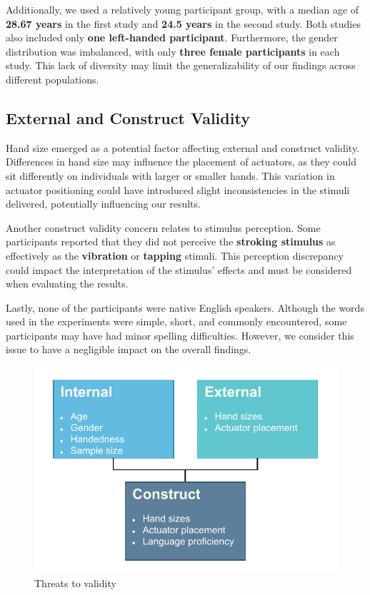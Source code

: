 Additionally, we used a relatively young participant group, with a median age of \textbf{28.67 years} in the first study and \textbf{24.5 years} in the second study. Both studies also included only \textbf{one left-handed participant}. Furthermore, the gender distribution was imbalanced, with only \textbf{three female participants} in each study. This lack of diversity may limit the generalizability of our findings across different populations.

\subsection{External and Construct Validity}
Hand size emerged as a potential factor affecting external and construct validity. Differences in hand size may influence the placement of actuators, as they could sit differently on individuals with larger or smaller hands. This variation in actuator positioning could have introduced slight inconsistencies in the stimuli delivered, potentially influencing our results.

Another construct validity concern relates to stimulus perception. Some participants reported that they did not perceive the \textbf{stroking stimulus} as effectively as the \textbf{vibration} or \textbf{tapping} stimuli. This perception discrepancy could impact the interpretation of the stimulus' effects and must be considered when evaluating the results.

Lastly, none of the participants were native English speakers. Although the words used in the experiments were simple, short, and commonly encountered, some participants may have had minor spelling difficulties. However, we consider this issue to have a negligible impact on the overall findings.




\begin{figure}
    \centering
    \includegraphics[width=0.5\linewidth]{src/pictures/StudyData/Threats_to_validity.drawio.pdf}
    \caption{Threats to validity}
    \label{fig:threats_to_validity}
\end{figure}




